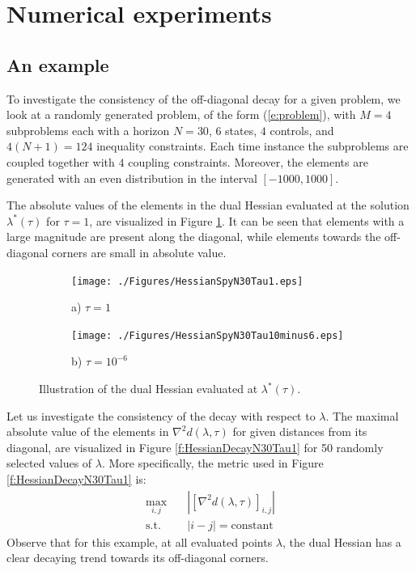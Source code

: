 \section{Numerical experiments}

\subsection{An example}
To investigate the consistency of the off-diagonal decay for a given problem, we look at a randomly generated problem, of the form (\ref{e:problem}), with $M=4$ subproblems each with a horizon $N=30$, $6$ states, $4$ controls, and $4(N+1) = 124$ inequality constraints. Each time instance the subproblems are coupled together with $4$ coupling constraints. Moreover, the elements are generated with an even distribution in the interval $[-1000, 1000]$.

The absolute values of the elements in the dual Hessian evaluated at the solution $\lambda^*(\tau)$ for $\tau=1$, are visualized in Figure \ref{f:HessianSpyN30Tau1}. It can be seen that elements with a large magnitude are present along the diagonal, while elements towards the off-diagonal corners are small in absolute value.

\begin{figure}[h]
\centering
\begin{subfigure}{.5\linewidth}
  \centering
  \texttt{[image: ./Figures/HessianSpyN30Tau1.eps]}
  \caption{a) $\tau = 1$}
  \label{f:HessianSpyN30Tau1}
\end{subfigure}%
\begin{subfigure}{.5\linewidth}
  \centering
  \texttt{[image: ./Figures/HessianSpyN30Tau10minus6.eps]}
  \caption{b) $\tau = 10^{-6}$}
  \label{f:HessianSpyN30Tau10minus6}
\end{subfigure}
\caption{Illustration of the dual Hessian evaluated at $\lambda^*(\tau)$.}
\label{fig:test}
\end{figure}

Let us investigate the consistency of the decay with respect to $\lambda$. The maximal absolute value of the elements in $\nabla^2 d(\lambda, \tau)$ for given distances from its diagonal, are visualized in Figure \ref{f:HessianDecayN30Tau1} for 50 randomly selected values of $\lambda$. More specifically, the metric used in Figure \ref{f:HessianDecayN30Tau1} is:
\begin{equation}
\begin{aligned}
\max_{i,j} & \quad | [\nabla^2 d(\lambda,\tau)]_{i,j} | \\
\text{s.t.} & \quad |i - j| = \text{constant}
\end{aligned}
\end{equation}
Observe that for this example, at all evaluated points $\lambda$, the dual Hessian has a clear decaying trend towards its off-diagonal corners.

